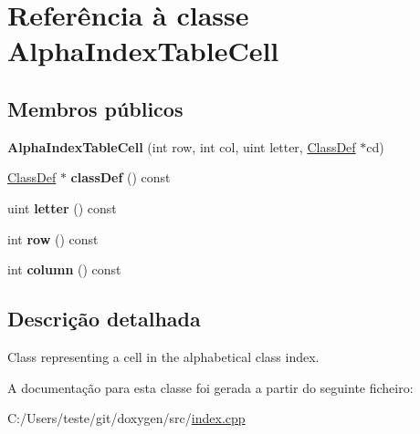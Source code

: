 \hypertarget{class_alpha_index_table_cell}{\section{Referência à classe Alpha\-Index\-Table\-Cell}
\label{class_alpha_index_table_cell}
}
\subsection*{Membros públicos}
\begin{DoxyCompactItemize}
\item 
\hypertarget{class_alpha_index_table_cell_a5c654622b248e963252edc7c1a5ec049}{{\bfseries Alpha\-Index\-Table\-Cell} (int row, int col, uint letter, \hyperlink{class_class_def}{Class\-Def} $\ast$cd)}\label{class_alpha_index_table_cell_a5c654622b248e963252edc7c1a5ec049}

\item 
\hypertarget{class_alpha_index_table_cell_aab2ee4c536711b2c9bd16319dacc360c}{\hyperlink{class_class_def}{Class\-Def} $\ast$ {\bfseries class\-Def} () const }\label{class_alpha_index_table_cell_aab2ee4c536711b2c9bd16319dacc360c}

\item 
\hypertarget{class_alpha_index_table_cell_ada472040436550156c7064317abe8caa}{uint {\bfseries letter} () const }\label{class_alpha_index_table_cell_ada472040436550156c7064317abe8caa}

\item 
\hypertarget{class_alpha_index_table_cell_a94244f770612e6c7739962d275ea903f}{int {\bfseries row} () const }\label{class_alpha_index_table_cell_a94244f770612e6c7739962d275ea903f}

\item 
\hypertarget{class_alpha_index_table_cell_a77699286fb6fcf791195b129badbe160}{int {\bfseries column} () const }\label{class_alpha_index_table_cell_a77699286fb6fcf791195b129badbe160}

\end{DoxyCompactItemize}


\subsection{Descrição detalhada}
Class representing a cell in the alphabetical class index. 

A documentação para esta classe foi gerada a partir do seguinte ficheiro\-:\begin{DoxyCompactItemize}
\item 
C\-:/\-Users/teste/git/doxygen/src/\hyperlink{index_8cpp}{index.\-cpp}\end{DoxyCompactItemize}
